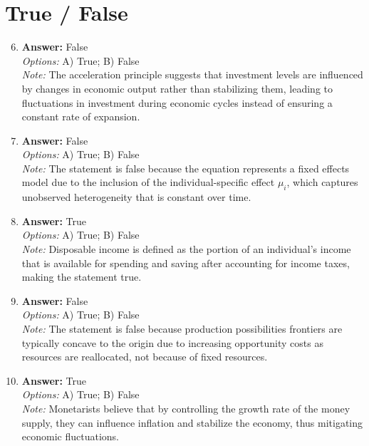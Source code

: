 \documentclass[12pt]{article}
\begin{document}
\section*{True / False}
\begin{enumerate}[label=\arabic*.]
\setcounter{enumi}{5}
\item \textbf{Answer:} False
\\ \textit{Options:} A) True; B) False
\\ \textit{Note:} The acceleration principle suggests that investment levels are influenced by changes in economic output rather than stabilizing them, leading to fluctuations in investment during economic cycles instead of ensuring a constant rate of expansion.
\item \textbf{Answer:} False
\\ \textit{Options:} A) True; B) False
\\ \textit{Note:} The statement is false because the equation represents a fixed effects model due to the inclusion of the individual-specific effect $\mu_i$, which captures unobserved heterogeneity that is constant over time.
\item \textbf{Answer:} True
\\ \textit{Options:} A) True; B) False
\\ \textit{Note:} Disposable income is defined as the portion of an individual's income that is available for spending and saving after accounting for income taxes, making the statement true.
\item \textbf{Answer:} False
\\ \textit{Options:} A) True; B) False
\\ \textit{Note:} The statement is false because production possibilities frontiers are typically concave to the origin due to increasing opportunity costs as resources are reallocated, not because of fixed resources.
\item \textbf{Answer:} True
\\ \textit{Options:} A) True; B) False
\\ \textit{Note:} Monetarists believe that by controlling the growth rate of the money supply, they can influence inflation and stabilize the economy, thus mitigating economic fluctuations.
\end{enumerate}
\end{document}
